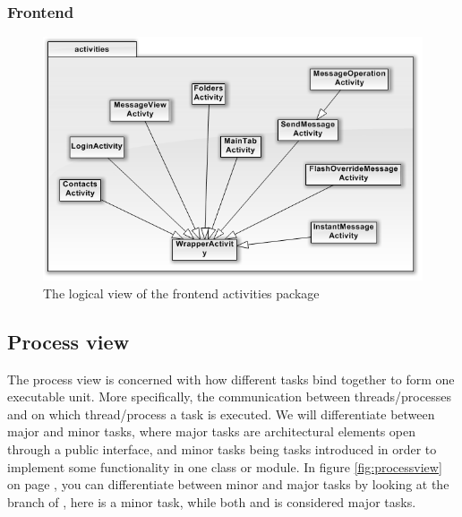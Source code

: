 \subsubsection{Frontend}
	\begin{figure}[H]
		\includegraphics[width=\textwidth]{FrontendClasses.png}
		\caption{The logical view of the frontend activities package}
		\label{fig:logicalfrontpackview}
	\end{figure}	
	
\subsection{Process view}
The process view is concerned with how different tasks bind together to form one executable unit. More specifically, the communication between threads/processes and on which thread/process a task is executed. We will differentiate between major and minor tasks, where major tasks are architectural elements open through a public interface, and minor tasks being tasks introduced in order to implement some functionality in one class or module.
In figure \ref{fig:processview} on page \pageref{fig:processview}, you can differentiate between minor and major tasks by looking at the  branch of , here  is a minor task, while both  and  is considered major tasks. 

